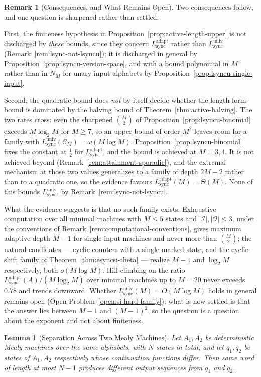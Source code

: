 \documentclass[12pt]{article}
\newtheorem{lemma}[theorem]{Lemma}
\theoremstyle{definition}
\newtheorem{remark}[theorem]{Remark}
\newcommand{\Lsync}{L_{\mathrm{sync}}^{\mathrm{adapt}}}
\newcommand{\Lsyncu}{L_{\mathrm{sync}}^{\mathrm{univ}}}
\begin{document}
\begin{remark}[Consequences, and What Remains Open]
\label{rem:lsyncu-consequences}
Two consequences follow, and one question is sharpened rather than settled.

First, the finiteness hypothesis in
Proposition~\ref{prop:active-length-upper} is not discharged by \emph{these}
bounds, since they concern $\Lsync$ rather than $\Lsyncu$
(Remark~\ref{rem:lsync-not-lsyncu}); it is discharged in general by
Proposition~\ref{prop:lsyncu-version-space}, and with a bound polynomial in
$M$ rather than in $N_M$ for unary input alphabets by
Proposition~\ref{prop:lsyncu-single-input}.

Second, the quadratic bound does \emph{not} by itself decide whether the
length-form bound is dominated by the halving bound of
Theorem~\ref{thm:active-halving}.  The two rates cross: even the sharpened
$\binom{M}{2}$ of Proposition~\ref{prop:lsyncu-binomial} exceeds $M\log_2M$ for
$M\ge7$, so an upper bound of order $M^2$ leaves room for a family with
$\Lsyncu(\mathcal C_M)=\omega(M\log M)$.  Proposition~\ref{prop:lsyncu-binomial} fixes the constant at $\tfrac12$ for
$\Lsync$, and the bound is achieved at $M=3,4$.  It is not achieved beyond
(Remark~\ref{rem:attainment-sporadic}), and the extremal mechanism at those two
values generalizes to a family of depth $2M-2$ rather than to a quadratic one,
so the evidence favours $\Lsync(M)=\Theta(M)$.  None of this bounds $\Lsyncu$,
by Remark~\ref{rem:lsync-not-lsyncu}.

What the evidence suggests is that no such family exists.  Exhaustive
computation over all minimal machines with $M\le5$ states and
$|\mathcal I|,|\mathcal O|\le3$, under the conventions of
Remark~\ref{rem:computational-conventions}, gives maximum adaptive depth
$M-1$ for single-input machines and never more than $\binom{M}{2}$; the natural
candidates --- cyclic counters with a single marked state, and the cyclic-shift
family of Theorem~\ref{thm:esyncsi-theta} --- realize $M-1$ and $\log_2M$
respectively, both $o(M\log M)$.  Hill-climbing on the ratio
$\Lsync(A)/(M\log_2M)$ over minimal machines up to $M=20$ never exceeds
$0.78$ and trends downward.  Whether $\Lsyncu(M)=O(M\log M)$ holds in general
remains open (Open Problem~\ref{open:si-hard-family}); what is now settled is
that the answer lies between $M-1$ and $(M-1)^2$, so the question is a
question about the exponent and not about finiteness.
\end{remark}

\begin{lemma}[Separation Across Two Mealy Machines]
\label{lem:moore-separation}
Let $A_1,A_2$ be deterministic Mealy machines over the same alphabets, with
$N$ states in total, and let $q_1,q_2$ be states of $A_1,A_2$ respectively
whose continuation functions differ.  Then some word of length at most $N-1$
produces different output sequences from $q_1$ and $q_2$.
\end{lemma}
\end{document}
